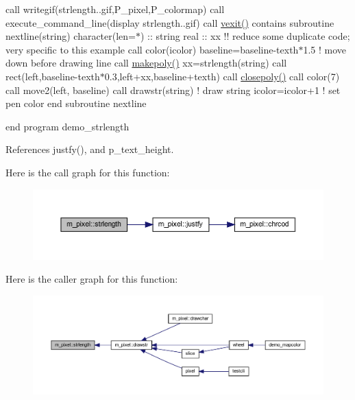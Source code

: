 call writegif(\textquotesingle{}strlength..\+gif\textquotesingle{},P\+\_\+pixel,P\+\_\+colormap) call execute\+\_\+command\+\_\+line(\textquotesingle{}display strlength..\+gif\textquotesingle{}) call \hyperlink{namespacem__pixel_a19ad6b65752322b0029a62cc0ebec3e8}{vexit()} contains subroutine nextline(string) character(len=$\ast$) \+:\+: string real \+:\+: xx !! reduce some duplicate code; very specific to this example call color(icolor) baseline=baseline-\/texth$\ast$1.5 ! move down before drawing line call \hyperlink{namespacem__pixel_ab7128437f95b40004bf73fc6e3f597f8}{makepoly()} xx=strlength(string) call rect(left,baseline-\/texth$\ast$0.3,left+xx,baseline+texth) call \hyperlink{namespacem__pixel_ab3dc83b63d2ab1bf3f63932abca4245d}{closepoly()} call color(7) call move2(left, baseline) call drawstr(string) ! draw string icolor=icolor+1 ! set pen color end subroutine nextline

end program demo\+\_\+strlength 

References justfy(), and p\+\_\+text\+\_\+height.

Here is the call graph for this function\+:
\nopagebreak
\begin{figure}[H]
\begin{center}
\leavevmode
\includegraphics[width=350pt]{namespacem__pixel_a0468f8d9308bade7f8f2a68a133271d2_cgraph}
\end{center}
\end{figure}
Here is the caller graph for this function\+:
\nopagebreak
\begin{figure}[H]
\begin{center}
\leavevmode
\includegraphics[width=350pt]{namespacem__pixel_a0468f8d9308bade7f8f2a68a133271d2_icgraph}
\end{center}
\end{figure}
\mbox{\label{namespacem__pixel_a063f74c3dd2f7f086dc47ec68abc22c9}} 
